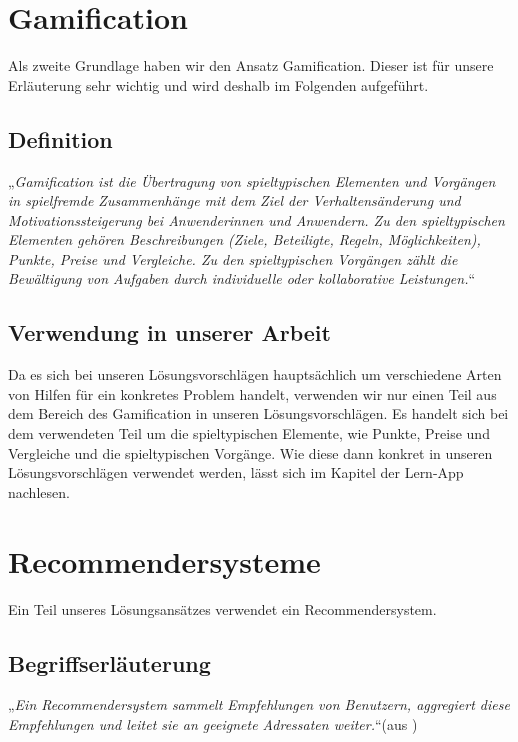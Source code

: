 \section{Gamification}
Als zweite Grundlage haben wir den Ansatz Gamification. Dieser ist für unsere Erläuterung sehr wichtig und wird deshalb im Folgenden aufgeführt.
\subsection{Definition}
„\textit{Gamification ist die Übertragung von spieltypischen Elementen und Vorgängen in spielfremde Zusammenhänge mit dem Ziel der Verhaltensänderung und Motivationssteigerung bei Anwenderinnen und Anwendern. Zu den spieltypischen Elementen gehören Beschreibungen (Ziele, Beteiligte, Regeln, Möglichkeiten), Punkte, Preise und Vergleiche. Zu den spieltypischen Vorgängen zählt die Bewältigung von Aufgaben durch individuelle oder kollaborative Leistungen.}“ \cite{gamification}

\subsection{Verwendung in unserer Arbeit}
Da es sich bei unseren Lösungsvorschlägen hauptsächlich um verschiedene Arten von Hilfen für ein konkretes Problem handelt, verwenden wir nur einen Teil aus dem Bereich des Gamification in unseren Lösungsvorschlägen. Es handelt sich bei dem verwendeten Teil um die spieltypischen Elemente, wie Punkte, Preise und Vergleiche und die spieltypischen Vorgänge. Wie diese dann konkret in unseren Lösungsvorschlägen verwendet werden, lässt sich im Kapitel der Lern-App nachlesen.

\section{Recommendersysteme}
Ein Teil unseres Lösungsansätzes verwendet ein Recommendersystem.
\subsection{Begriffserläuterung}
„\textit{Ein Recommendersystem sammelt Empfehlungen von Benutzern, aggregiert diese Empfehlungen und leitet sie an geeignete Adressaten weiter.}“(aus \cite{recommender})

